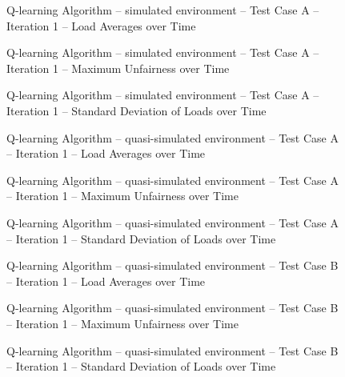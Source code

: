 
\newcommand{\insertgnuplot}[2]{
	\begin{center} 
		\begin{figure}[H]
			\resizebox{5in}{!}{
			\rotatebox{270}{
			\texttt{[image: \#1]}}}
			\caption{#2}
		\end{figure}
	\end{center}
}


\insertgnuplot{../testing/random-dpa/sim/testa/iter1/loads.ps}
   {Q-learning Algorithm -- simulated environment -- Test Case A --
   Iteration 1 -- Load Averages over Time}

\insertgnuplot{../testing/random-dpa/sim/testa/iter1/max-unfair.ps}
   {Q-learning Algorithm -- simulated environment -- Test Case A --
   Iteration 1 -- Maximum Unfairness over Time}

\insertgnuplot{../testing/random-dpa/sim/testa/iter1/stddev-data.ps}
   {Q-learning Algorithm -- simulated environment -- Test Case A --
   Iteration 1 -- Standard Deviation of Loads over Time}

\insertgnuplot{../testing/random-dpa/quasi/testa/iter1/loads.ps}
   {Q-learning Algorithm -- quasi-simulated environment -- Test Case A --
   Iteration 1 -- Load Averages over Time}

\insertgnuplot{../testing/random-dpa/quasi/testa/iter1/max-unfair.ps}
   {Q-learning Algorithm -- quasi-simulated environment -- Test Case A --
   Iteration 1 -- Maximum Unfairness over Time}

\insertgnuplot{../testing/random-dpa/quasi/testa/iter1/stddev-data.ps}
   {Q-learning Algorithm -- quasi-simulated environment -- Test Case A --
   Iteration 1 -- Standard Deviation of Loads over Time}

\insertgnuplot{../testing/random-dpa/quasi/testb/iter1/loads.ps}
   {Q-learning Algorithm -- quasi-simulated environment -- Test Case B --
   Iteration 1 -- Load Averages over Time}

\insertgnuplot{../testing/random-dpa/quasi/testb/iter1/max-unfair.ps}
   {Q-learning Algorithm -- quasi-simulated environment -- Test Case B --
   Iteration 1 -- Maximum Unfairness over Time}

\insertgnuplot{../testing/random-dpa/quasi/testb/iter1/stddev-data.ps}
   {Q-learning Algorithm -- quasi-simulated environment -- Test Case B --
   Iteration 1 -- Standard Deviation of Loads over Time}

